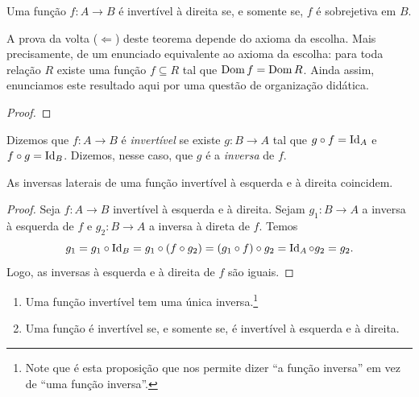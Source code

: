 \begin{theorem} \label{teo.set:invdireita}
    Uma função $f:A \to B$ é invertível à direita se, e somente se, $f$ é sobrejetiva em $B$.
\end{theorem}

\begin{remark}
    A prova da volta ($\Leftarrow$) deste teorema depende do axioma da escolha. Mais precisamente, de um enunciado equivalente ao axioma da escolha: para toda relação $R$ existe uma função $f \subseteq R$ tal que $\operatorname{Dom} f = \operatorname{Dom} R$. Ainda assim, enunciamos este resultado aqui por uma questão de organização didática.  
\end{remark}

\begin{proof}
    \blackproof
\end{proof}

\begin{definition}
    Dizemos que $f: A \to B$ é \emph{invertível} se existe $g : B \to A$ tal que $g \circ f = \operatorname{Id}_A$ e $f \circ g = \operatorname{Id}_B$. Dizemos, nesse caso, que $g$ é a \emph{inversa} de $f$.
\end{definition}

\begin{lemma} \label{lema.set:invesqdiriguais}
    As inversas laterais de uma função invertível à esquerda e à direita coincidem.
\end{lemma}

\begin{proof}
    Seja $f : A \to B$ invertível à esquerda e à direita. Sejam $g_1 : B \to A$ a inversa à esquerda de $f$ e $g_2 : B \to A$ a inversa à direta de $f$. Temos
        \[
            g_1 = g_1 \circ \operatorname{Id}_B = g_1 \circ (f \circ g_2) = (g_1 \circ f) \circ g_2 = \operatorname{Id}_A \circ g_2 = g_2.    
        \]
    Logo, as inversas à esquerda e à direita de $f$ são iguais. \blackproof
\end{proof}

\begin{proposition}
    \leavevmode
        \begin{enumerate}[leftmargin=*, align=left, label=\textbf{(\alph*)}]
            \item Uma função invertível tem uma única inversa.\footnote{Note que é esta proposição que nos permite dizer ``a função inversa'' em vez de ``uma função inversa''. }
            \item Uma função é invertível se, e somente se, é invertível à esquerda e à direita.
        \end{enumerate}
\end{proposition}

